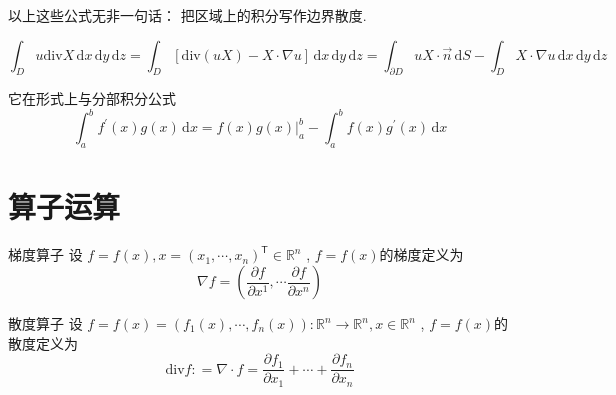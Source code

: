 \documentclass[../../PDE.tex]{subfiles}
\begin{document}
\hspace*{\fill}


以上这些公式无非一句话： 把区域上的积分写作边界散度.

\begin{theorem}
    \[
    \int_{D} u \mathrm{div}X \,\mathrm{d} x\,\mathrm{d} y\,\mathrm{d} z =  \int_{D} \left[ \mathrm{div}\left( uX \right)-X\cdot  \nabla u  \right]\,\mathrm{d} x\,\mathrm{d} y\,\mathrm{d} z =  \int_{\partial D} uX\cdot \vec{n} \,\mathrm{d} S-\int_{D} X \cdot  \nabla u\,\mathrm{d} x\,\mathrm{d} y\,\mathrm{d} z 
    \]
\end{theorem}

\begin{note}

    它在形式上与分部积分公式 \[
    \int_{a}^{b} f^{\prime} \left( x \right)g\left( x \right)\,\mathrm{d} x = \left. f\left( x \right)g\left( x \right)   \right|_{a}^{b} - \int_{a}^{b} f\left( x \right)g^{\prime} \left( x \right)\,\mathrm{d} x    
    \]

\end{note}

\section{算子运算}

\begin{definition}{梯度算子}
    设 \(  f=  f\left( x \right),x =  \left(  x_1,\cdots,x_n  \right)^{\mathsf{T}}    \in \mathbb{R} ^{n}\) , \(  f= f\left( x \right)   \)的梯度定义为 \[
        \nabla f =  \left( \frac{\partial f}{\partial x^{1}},\cdots \frac{\partial f}{\partial x^{n}} \right) 
       \]  
\end{definition}

\begin{definition}{散度算子}
    设 \(  f=  f\left( x \right)= \left( f_1\left( x \right),\cdots ,f_{n}\left( x \right)   \right): \mathbb{R} ^{n}\to \mathbb{R} ^{n},x \in \mathbb{R} ^{n}    \) , \(  f= f\left( x \right)   \)的散度定义为 \[
    \mathrm{div}f: =   \nabla \cdot f =  \frac{\partial f_1 }{\partial x_1}+ \cdots + \frac{\partial f_{n}}{\partial x_{n}}
    \] 
\end{definition}
\end{document}
